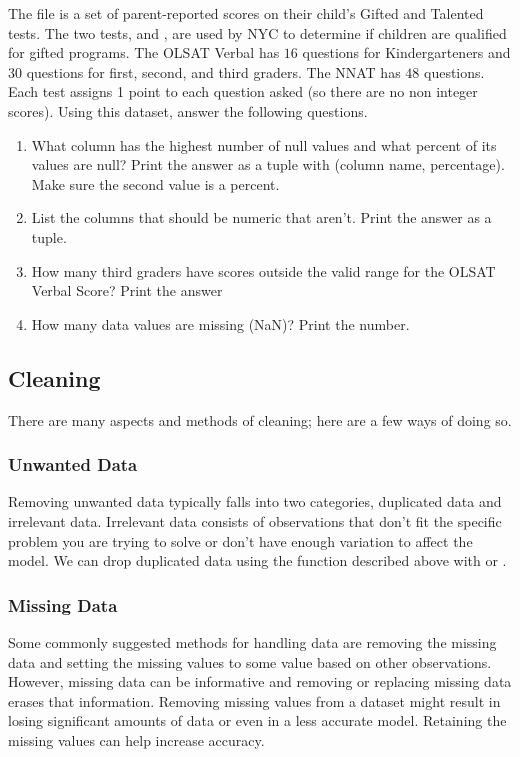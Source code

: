 \begin{problem}
The  file is a set of parent-reported scores on their child's Gifted and Talented tests. 
The two tests,  and , are used by NYC to determine if children are qualified for gifted programs.
The OLSAT Verbal has $16$ questions for Kindergarteners and 30 questions for first, second, and third graders.
The NNAT has $48$ questions. Each test assigns 1 point to each question asked (so there are no non integer scores).
Using this dataset, answer the following questions.

\begin{enumerate}
\item What column has the highest number of null values and what percent of its values are null? Print the answer as a tuple with (column name, percentage). 
Make sure the second value is a percent.

\item List the columns that should be numeric that aren't. Print the answer as a tuple.

\item How many third graders have scores outside the valid range for the OLSAT Verbal Score? Print the answer

\item How many data values are missing (NaN)? Print the number.

\end{enumerate}
\end{problem}

\subsection*{Cleaning}
There are many aspects and methods of cleaning; here are a few ways of doing so.
 
\subsubsection*{Unwanted Data}
Removing unwanted data typically falls into two categories, duplicated data and irrelevant data.
Irrelevant data consists of observations that don't fit the specific problem you are trying to solve or don't have enough variation to affect the model.
We can drop duplicated data using the  function described above with  or .
\subsubsection*{Missing Data}
Some commonly suggested methods for handling data are removing the missing data and setting the missing values to some value based on other observations.
However, missing data can be informative and removing or replacing missing data erases that information.
Removing missing values from a dataset might result in losing significant amounts of data or even in a less accurate model. Retaining the missing values can help increase accuracy.
\\

